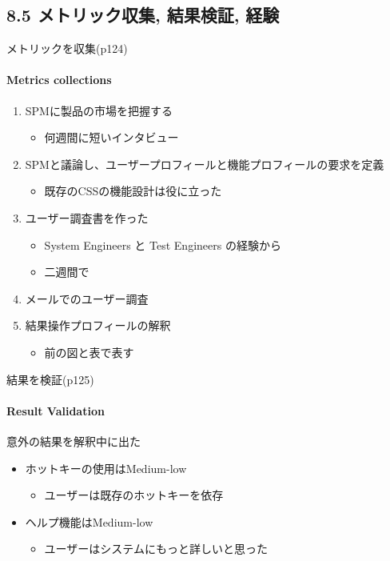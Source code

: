 \subsection{8.5 メトリック収集, 結果検証, 経験}
\begin{frame}{メトリックを収集(p124)}
\framesubtitle{Metrics collections}
\begin{enumerate}
\item SPMに製品の市場を把握する
    \begin{itemize}
    \item 何週間に短いインタビュー
    \end{itemize}
\item SPMと議論し、ユーザープロフィールと機能プロフィールの要求を定義
    \begin{itemize}
    \item 既存のCSSの機能設計は役に立った
    \end{itemize}
\item ユーザー調査書を作った
    \begin{itemize}
    \item System Engineers と Test Engineers の経験から
    \item 二週間で
    \end{itemize}
\item メールでのユーザー調査
\item 結果操作プロフィールの解釈
    \begin{itemize}
    \item 前の図と表で表す
    \end{itemize}
\end{enumerate}
\end{frame}

\begin{frame}{結果を検証(p125)}
\framesubtitle{Result Validation}
意外の結果を解釈中に出た
\begin{itemize}
\item ホットキーの使用はMedium-low
    \begin{itemize}
    \item ユーザーは既存のホットキーを依存
    \end{itemize}
\item ヘルプ機能はMedium-low
    \begin{itemize}
    \item ユーザーはシステムにもっと詳しいと思った
    \end{itemize}
\end{itemize}
\end{frame}
